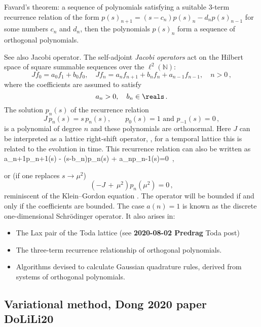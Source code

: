 {
{Favard's theorem}:
a sequence of polynomials satisfying a suitable 3-term recurrence
relation of the form
\(p(s)_{n+1}=(s-c_n)p(s)_n-d_{n}p(s)_{n-1}\)
for some numbers $c_{n}$ and $d_{n}$,
then the polynomials $p(s)_{n}$ form a sequence of orthogonal polynomials.

See also
 {Jacobi operator}.
The self-adjoint {\em Jacobi operators} act on the Hilbert space of square
summable sequences over the $\ell^2(\mathbb{N})$:
\[
Jf_0 = a_0 f_1 + b_0 f_0, \quad Jf_n
     =  a_n f_{n+1} + b_n f_n + a_{n-1} f_{n-1}, \quad n>0
\,,
\]
where the coefficients are assumed to satisfy
\[
a_n >0, \quad b_n \in \reals
\,.
\]
The solution $p_n(s)$ of the recurrence relation
\[
J\, p_n(s) = {s}\, p_n(s), \qquad p_0(s)=1 \text{ and } p_{-1} (s)=0
\,,
\]
is a polynomial of degree $n$ and these polynomials are orthonormal.
Here $J$ can be interpreted as a lattice right-shift operator, \ie, for
a temporal lattice this is related to the evolution in time.
This recurrence relation can also be written as
\beq
a_{n+1}p_{n+1}(s) - ({s}-b_n)p_n(s) + a_{n}p_{n-1}(s)=0
\,,

or (if one replaces ${s}\to\mu^2$)
\[
(-J\,+\,\mu^2)p_n(\mu^2) = 0
\,,
\]
reminiscent of the Klein–Gordon equation .
The operator will be bounded if and only if the coefficients are bounded.
The case $a(n)=1$ is known as the discrete one-dimensional Schr\"odinger operator.
It also arises in:
\begin{itemize}
  \item
The Lax pair of the Toda lattice (see {\bf 2020-08-02 Predrag} Toda post)
  \item
The three-term recurrence relationship of orthogonal polynomials.
  \item
Algorithms devised to calculate Gaussian quadrature
rules, derived from systems of orthogonal polynomials.
\end{itemize}

\subsection{Variational method, Dong 2020 paper {DoLiLi20}}
\label{sect:DoLiLi20}

}
